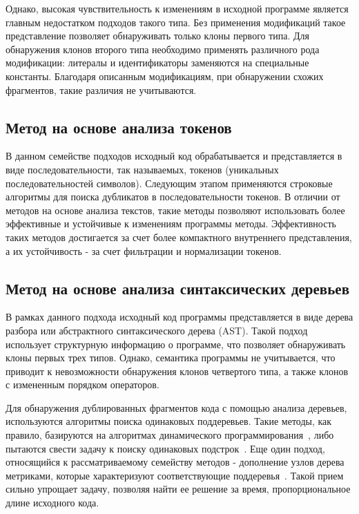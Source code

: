 Однако, высокая чувствительность к изменениям в исходной программе является главным недостатком подходов такого типа. Без применения модификаций такое представление позволяет обнаруживать только клоны первого типа. Для обнаружения клонов второго типа необходимо применять различного рода модификации: литералы и идентификаторы заменяются на специальные константы. Благодаря описанным модификациям, при обнаружении схожих фрагментов, такие различия не учитываются.

\subsection{Метод на основе анализа токенов}

В данном семействе подходов исходный код обрабатывается и представляется в виде последовательности, так называемых, токенов (уникальных последовательностей символов). Следующим этапом применяются строковые алгоритмы для поиска дубликатов в последовательности токенов. В отличии от методов на основе анализа текстов, такие методы позволяют использовать более эффективные и устойчивые к изменениям программы методы. Эффективность таких методов достигается за счет более компактного внутреннего представления, а их устойчивость - за счет фильтрации и нормализации токенов.

\subsection{Метод на основе анализа синтаксических деревьев}

В рамках данного подхода исходный код программы представляется в виде дерева разбора или абстрактного синтаксического дерева (AST). Такой подход использует структурную информацию о программе, что позволяет обнаруживать клоны первых трех типов. Однако, семантика программы не учитывается, что приводит к невозможности обнаружения клонов четвертого типа, а также клонов с измененным порядком операторов.

Для обнаружения дублированных фрагментов кода с помощью анализа деревьев, используются алгоритмы поиска одинаковых поддеревьев. Такие методы, как правило, базируются на алгоритмах динамического программирования~\cite{dynamicprog}, либо пытаются свести задачу к поиску одинаковых подстрок~\cite{substrings}. Еще один подход, относящийся к рассматриваемому семейству методов - дополнение узлов дерева метриками, которые характеризуют соответствующие поддеревья~\cite{subtrees}. Такой прием сильно упрощает задачу, позволяя найти ее решение за время, пропорциональное длине исходного кода.

